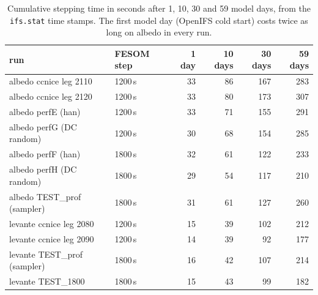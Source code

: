 \documentclass[11pt,a4paper]{article}
\begin{document}
\begin{table}[H]\centering\small
\begin{tabular}{llrrrr}
\hline
run & FESOM step & 1 day & 10 days & 30 days & 59 days\\
\hline
albedo ccnice leg 2110 & 1200\,s & 33 & 86 & 167 & 283\\
albedo ccnice leg 2120 & 1200\,s & 33 & 80 & 173 & 307\\
albedo perfE (han) & 1200\,s & 33 & 71 & 155 & 291\\
albedo perfG (DC random) & 1200\,s & 30 & 68 & 154 & 285\\
albedo perfF (han) & 1800\,s & 32 & 61 & 122 & 233\\
albedo perfH (DC random) & 1800\,s & 29 & 54 & 117 & 210\\
albedo TEST\_prof (sampler) & 1800\,s & 31 & 61 & 127 & 260\\
\hline
levante ccnice leg 2080 & 1200\,s & 15 & 39 & 102 & 212\\
levante ccnice leg 2090 & 1200\,s & 14 & 39 & 92 & 177\\
levante TEST\_prof (sampler) & 1800\,s & 16 & 42 & 107 & 214\\
levante TEST\_1800 & 1800\,s & 15 & 43 & 99 & 182\\
\hline
\end{tabular}
\caption{Cumulative stepping time in seconds after 1, 10, 30 and 59 model days, from the \texttt{ifs.stat} time stamps. The first model day (OpenIFS cold start) costs twice as long on albedo in every run.}\label{tab:steady}
\end{table}
\end{document}
